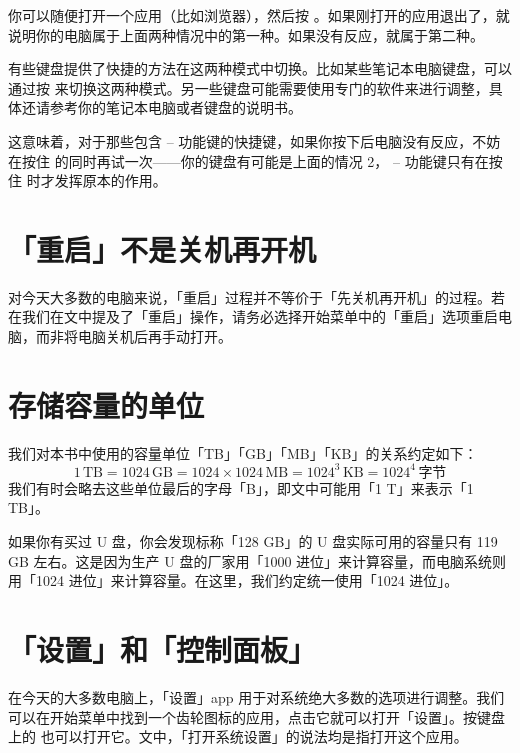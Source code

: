 你可以随便打开一个应用（比如浏览器），然后按 。如果刚打开的应用退出了，就说明你的电脑属于上面两种情况中的第一种。如果没有反应，就属于第二种。

有些键盘提供了快捷的方法在这两种模式中切换。比如某些笔记本电脑键盘，可以通过按  来切换这两种模式。另一些键盘可能需要使用专门的软件来进行调整，具体还请参考你的笔记本电脑或者键盘的说明书。

\begin{note}
	这意味着，对于那些包含  --  功能键的快捷键，如果你按下后电脑没有反应，不妨在按住  的同时再试一次——你的键盘有可能是上面的情况 2， --  功能键只有在按住  时才发挥原本的作用。
\end{note}

\section{「重启」不是关机再开机}

对今天大多数的电脑来说，「重启」过程并不等价于「先关机再开机」的过程。若在我们在文中提及了「重启」操作，请务必选择开始菜单中的「重启」选项重启电脑，而非将电脑关机后再手动打开。

\section{存储容量的单位}

我们对本书中使用的容量单位「TB」「GB」「MB」「KB」的关系约定如下：
\[
  1\,\mathrm{TB}=1024\,\mathrm{GB}=1024\times1024\,\mathrm{MB}=1024^3\,\mathrm{KB}=1024^4\,\text{字节}
\]
我们有时会略去这些单位最后的字母「B」，即文中可能用「1 T」来表示「1 TB」。

\begin{note}
  如果你有买过 U 盘，你会发现标称「128 GB」的 U 盘实际可用的容量只有 119 GB 左右。这是因为生产 U 盘的厂家用「1000 进位」来计算容量，而电脑系统则用「1024 进位」来计算容量。在这里，我们约定统一使用「1024 进位」。
\end{note}

\section{「设置」和「控制面板」}

在今天的大多数电脑上，「设置」app 用于对系统绝大多数的选项进行调整。我们可以在开始菜单中找到一个齿轮图标的应用，点击它就可以打开「设置」。按键盘上的  也可以打开它。文中，「打开系统设置」的说法均是指打开这个应用。

